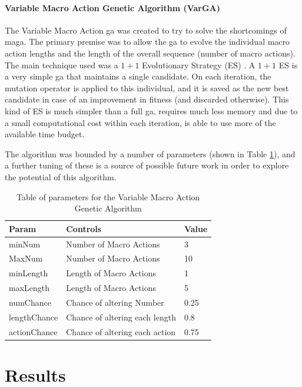 \documentclass{IEEEtran}
\begin{document}
\paragraph{Variable Macro Action Genetic Algorithm (VarGA)}
The Variable Macro Action \gls{ga} was created to try to solve the shortcomings of \gls{maga}. The primary premise was to allow the \gls{ga} to evolve the individual macro action lengths and the length of the overall sequence (number of macro actions). The main technique used was a $1 + 1$ Evolutionary Strategy (ES) \cite{t.back2000evolutionary-co}. A $1 + 1$ ES is a very simple \gls{ga} that maintains a single candidate. On each iteration, the mutation operator is applied to this individual, and it is saved as the new best candidate in case of an improvement in fitness (and discarded otherwise). This kind of ES is much simpler than a full \gls{ga}, requires much less memory and due to a small computational cost within each iteration, is able to use more of the available time budget. 

The algorithm was bounded by a number of parameters (shown in Table \ref{vmagaTable}), and a further tuning of these is a source of possible future work in order to explore the potential of this algorithm.

\begin{table}[!t]
\begin{center}
\begin{tabular}{| l | l | l |}
\hline
\textbf{Param} & \textbf{Controls} & \textbf{Value} \\
\hline
minNum & Number of Macro Actions & 3 \\
MaxNum & Number of Macro Actions & 10 \\
minLength & Length of Macro Actions & 1 \\
maxLength & Length of Macro Actions & 5 \\
numChance & Chance of altering Number & 0.25 \\
lengthChance & Chance of altering each length & 0.8 \\
actionChance & Chance of altering each action & 0.75 \\
\hline
\end{tabular}
\caption{Table of parameters for the Variable Macro Action Genetic Algorithm}
\label{vmagaTable}
\end{center}
\end{table}




\section{Results}
\end{document}
